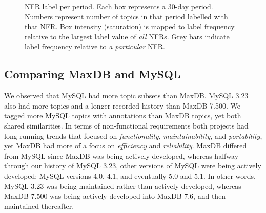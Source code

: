 \documentclass[]{sig-alternate}
\newcommand{\XXX}[1]{\textcolor{red}{{\it \textbf{[XXX: #1]}}}}
\begin{document}
\begin{figure}[ht]
\centering
{}           
                                             
\caption[]{NFR label per period. Each box represents a 30-day period. Numbers represent number of topics in that period labelled with that NFR. Box intensity (saturation) is mapped to label frequency relative to the largest label value of \emph{all} NFRs. Grey bars indicate label frequency relative to \emph{a particular} NFR.
}
\label{fig:timelines}
\end{figure}

\subsection{Comparing MaxDB and MySQL}

\label{sec:comparison}

We observed that MySQL had more topic subsets than MaxDB. 
MySQL 3.23 also had more topics and a longer recorded history than MaxDB 7.500. 
We tagged more MySQL topics with annotations than MaxDB topics, yet both shared similarities. 
In terms of non-functional requirements both projects had long running trends that focused on \emph{functionality}, \emph{maintainability}, and \emph{portability}, yet MaxDB had more of a focus on \emph{efficiency} and \emph{reliability}. 
MaxDB differed from MySQL since MaxDB was being actively developed, whereas halfway through our history of MySQL 3.23, other versions of MySQL were being actively developed: MySQL versions 4.0, 4.1, and eventually 5.0 and 5.1. 
In other words, MySQL 3.23 was being maintained rather than actively developed, whereas MaxDB 7.500 was being actively developed into MaxDB 7.6, and then maintained thereafter.
\end{document}
